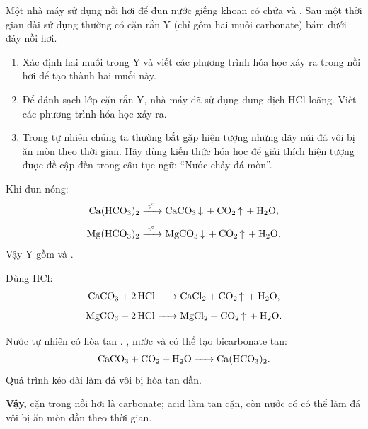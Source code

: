 \begin{tuluyen}
Một nhà máy sử dụng nồi hơi để đun nước giếng khoan có chứa  và . Sau một thời gian dài sử dụng thường có cặn rắn Y (chỉ gồm hai muối carbonate) bám dưới đáy nồi hơi.
\begin{enumerate}
\item Xác định hai muối trong Y và viết các phương trình hóa học xảy ra trong nồi hơi để tạo thành hai muối này.
\item Để đánh sạch lớp cặn rắn Y, nhà máy đã sử dụng dung dịch HCl loãng. Viết các phương trình hóa học xảy ra.
\item Trong tự nhiên chúng ta thường bắt gặp hiện tượng những dãy núi đá vôi bị ăn mòn theo thời gian. Hãy dùng kiến thức hóa học để giải thích hiện tượng được đề cập đến trong câu tục ngữ: ``Nước chảy đá mòn''.
\end{enumerate}
\begin{loigiaiBT}
Khi đun nóng:
\[
\ce{Ca(HCO3)2 ->[t^\circ] CaCO3 v + CO2 ^ + H2O},
\]
\[
\ce{Mg(HCO3)2 ->[t^\circ] MgCO3 v + CO2 ^ + H2O}.
\]
Vậy Y gồm  và .

Dùng HCl:
\[
\ce{CaCO3 + 2HCl -> CaCl2 + CO2 ^ + H2O},
\]
\[
\ce{MgCO3 + 2HCl -> MgCl2 + CO2 ^ + H2O}.
\]

Nước tự nhiên có hòa tan . , nước và  có thể tạo bicarbonate tan:
\[
\ce{CaCO3 + CO2 + H2O -> Ca(HCO3)2}.
\]
Quá trình kéo dài làm đá vôi bị hòa tan dần.

\textbf{Vậy,} cặn trong nồi hơi là carbonate; acid làm tan cặn, còn nước có  có thể làm đá vôi bị ăn mòn dần theo thời gian.
\end{loigiaiBT}
\end{tuluyen}

